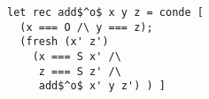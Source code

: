 \begin{figure}[!t]
  \centering
  \begin{minipage}{\columnwidth}
    \begin{lstlisting}[label={add}, caption={Addition relation}, captionpos=b, frame=tb]
let rec add$^o$ x y z = conde [
  (x === O /\ y === z);
  (fresh (x' z')
    (x === S x' /\
     z === S z' /\
     add$^o$ x' y z') ) ]
    \end{lstlisting}
  \end{minipage}
\end{figure}
